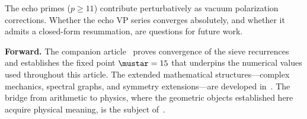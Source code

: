 \documentclass[12pt,a4paper]{article}
\begin{document}
The echo primes ($p \geq 11$) contribute perturbatively as vacuum
polarization corrections.  Whether the echo VP series converges
absolutely, and whether it admits a closed-form resummation, are
questions for future work.

\textbf{Forward.}
The companion article~\cite{companion_M3} proves convergence of the
sieve recurrences and establishes the fixed point $\mustar = 15$ that
underpins the numerical values used throughout this article.
The extended mathematical structures---complex mechanics, spectral
graphs, and symmetry extensions---are developed
in~\cite{companion_M4}.  The bridge from arithmetic to physics, where
the geometric objects established here acquire physical meaning, is
the subject of~\cite{companion_M5}.



\end{document}
